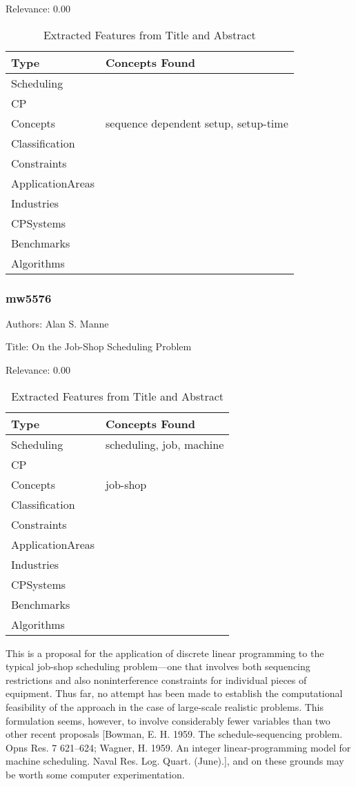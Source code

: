 Relevance:  0.00

{\scriptsize
\begin{longtable}{p{2cm}p{20cm}}
\caption{Extracted Features from Title and Abstract}\\ \toprule
Type & Concepts Found\\ \midrule
\endhead
\bottomrule
\endfoot
Scheduling & \\ 
CP & \\ 
Concepts & sequence dependent setup, setup-time\\ 
Classification & \\ 
Constraints & \\ 
ApplicationAreas & \\ 
Industries & \\ 
CPSystems & \\ 
Benchmarks & \\ 
Algorithms & \\ 
\end{longtable}
}



\subsubsection{mw5576}
\label{mw:mw5576}

Authors: Alan S. Manne

Title: On the Job-Shop Scheduling Problem

Relevance:  0.00

{\scriptsize
\begin{longtable}{p{2cm}p{20cm}}
\caption{Extracted Features from Title and Abstract}\\ \toprule
Type & Concepts Found\\ \midrule
\endhead
\bottomrule
\endfoot
Scheduling & scheduling, job, machine\\ 
CP & \\ 
Concepts & job-shop\\ 
Classification & \\ 
Constraints & \\ 
ApplicationAreas & \\ 
Industries & \\ 
CPSystems & \\ 
Benchmarks & \\ 
Algorithms & \\ 
\end{longtable}
}

  This is a proposal for the application of discrete linear programming to the typical job-shop scheduling problem—one that involves both sequencing restrictions and also noninterference constraints for individual pieces of equipment. Thus far, no attempt has been made to establish the computational feasibility of the approach in the case of large-scale realistic problems. This formulation seems, however, to involve considerably fewer variables than two other recent proposals [Bowman, E. H. 1959. The schedule-sequencing problem. Opns Res. 7 621–624; Wagner, H. 1959. An integer linear-programming model for machine scheduling. Naval Res. Log. Quart. (June).], and on these grounds may be worth some computer experimentation.  

